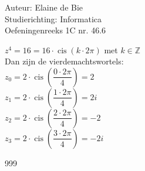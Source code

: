 \documentclass[a4paper]{article}
\newcommand{\cis}{\operatorname{cis}}
\newcommand{\Z}{\mathbb{Z}}
\begin{document}
  
  
\noindent \large Auteur: Elaine de Bie\\
\noindent \large Studierichting: Informatica\\
\noindent \large Oefeningenreeks 1C nr. 46.6 \\

\medskip


\normalsize


$z^4 = 16 = 16\cdot\cis(k\cdot2\pi)$ met $k \in \Z$ \\

Dan zijn de vierdemachtswortels:\\

$z_0 = 2 \cdot\cis\left(\dfrac{0\cdot2\pi}{4}\right) = 2$\\

$z_1 = 2 \cdot\cis\left(\dfrac{1\cdot 2\pi}{4}\right) = 2i$\\

$z_2 = 2 \cdot\cis\left(\dfrac{2\cdot 2\pi}{4}\right) = -2$\\

$z_3 = 2 \cdot\cis\left(\dfrac{3\cdot 2\pi}{4}\right) = -2i$\\




\begin{thebibliography}{999}
\end{thebibliography}
\end{document}
